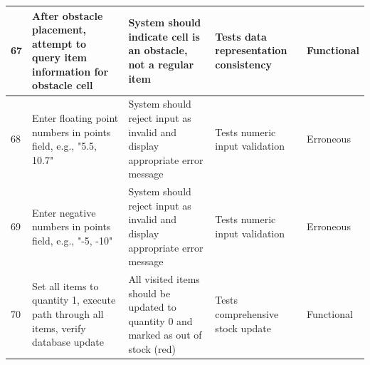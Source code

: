 \begin{longtable}{|p{}|p{}|p{}|p{}|p{}|}
\hline
67 & After obstacle placement, attempt to query item information for obstacle cell & System should indicate cell is an obstacle, not a regular item & Tests data representation consistency & Functional \\
\hline
68 & Enter floating point numbers in points field, e.g., "5.5, 10.7" & System should reject input as invalid and display appropriate error message & Tests numeric input validation & Erroneous \\
\hline
69 & Enter negative numbers in points field, e.g., "-5, -10" & System should reject input as invalid and display appropriate error message & Tests numeric input validation & Erroneous \\
\hline
70 & Set all items to quantity 1, execute path through all items, verify database update & All visited items should be updated to quantity 0 and marked as out of stock (red) & Tests comprehensive stock update & Functional \\
\hline
\end{longtable}
